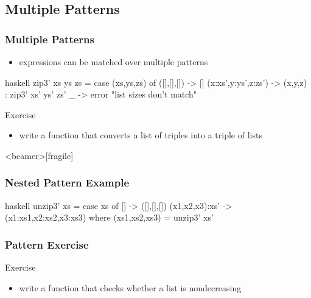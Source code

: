 \documentclass[dvipsnames]{beamer}
\theoremstyle{plain}
\begin{document}
\subsection{Multiple Patterns}

\begin{frame}[fragile]
  \frametitle{Multiple Patterns}

  \begin{itemize}
    \item expressions can be matched over multiple patterns
  \end{itemize}

  \begin{example}
    \pause
    \begin{pygments}{haskell}
zip3' xs ys zs =
    case (xs,ys,zs) of
      ([],[],[]) -> []
      (x:xs',y:ys',z:zs') -> (x,y,z) : zip3' xs' ys' zs'
      _ -> error "list sizes don't match"
    \end{pygments}
  \end{example}

  \pause
  \begin{block}{Exercise}
    \begin{itemize}
      \item write a function that converts a list of triples into a triple of
        lists
    \end{itemize}
  \end{block}
\end{frame}

\begin{frame}<beamer>[fragile]
  \frametitle{Nested Pattern Example}

  \begin{example}
    \begin{pygments}{haskell}
unzip3' xs =
    case xs of
      [] -> ([],[],[])
      (x1,x2,x3):xs' -> (x1:xs1,x2:xs2,x3:xs3)
                        where (xs1,xs2,xs3) = unzip3' xs'
    \end{pygments}
  \end{example}
\end{frame}

\begin{frame}
  \frametitle{Pattern Exercise}

  \begin{block}{Exercise}
    \begin{itemize}
      \item write a function that checks whether a list is nondecreasing
    \end{itemize}
  \end{block}
\end{frame}
\end{document}
